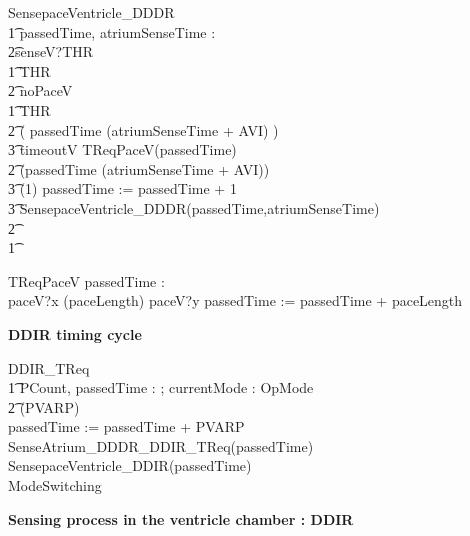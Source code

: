 \begin{circusaction}
SensepaceVentricle\_DDDR \circdef \\
\t1 \circvres passedTime, atriumSenseTime : \nat \\
\t2\circspot senseV?THR \then \\
\t1 \circif  THR  \circthen\\
\t2 noPaceV \then \Skip \\
\t1 \circelse \lnot  THR  \circthen\\
\t2 \circif  ( passedTime \geq (atriumSenseTime + AVI) ) \circthen \\
\t3 timeoutV \then TReqPaceV(passedTime) \\
\t2 \circelse \lnot (passedTime \geq (atriumSenseTime + AVI)) \circthen \\
\t3  \circwait(1) \circseq passedTime := passedTime + 1 \circseq\\
\t3  SensepaceVentricle\_DDDR(passedTime,atriumSenseTime) \\
\t2 \circfi\\ 
\t1 \circfi \\ 
\end{circusaction}



\begin{circusaction}
	TReqPaceV \circdef \circvres passedTime : \nat \circspot \\
	paceV?x \then \circwait(paceLength) \circseq paceV?y \then passedTime := passedTime + paceLength 
\end{circusaction}




\textbf{DDIR timing cycle}

\begin{circusaction}
	DDIR\_TReq \circdef \\
  \t1 \circvres PCount, passedTime : \nat ; \circvres currentMode : OpMode \\
  \t2 \circspot 
  \circwait(PVARP) \circseq \\
   passedTime := passedTime + PVARP \circseq \\
   SenseAtrium\_DDDR\_DDIR\_TReq(passedTime) \circseq \\
   SensepaceVentricle\_DDIR(passedTime) \circseq \\
   ModeSwitching  
\end{circusaction}


\textbf {Sensing process in the ventricle chamber : DDIR}\\

